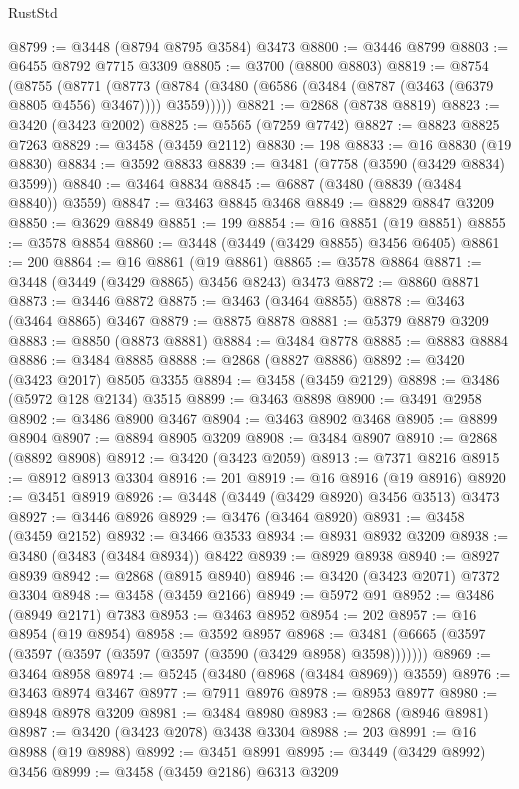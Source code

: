 \begin{lexlean}{RustStd}
\begin{coremodule}
{{{{{{{{{{{{{{{{{{{@8799 := @3448 (@8794 @8795 @3584) @3473
@8800 := @3446 @8799
@8803 := @6455 @8792 @7715 @3309
@8805 := @3700 (@8800 @8803)
@8819 := @8754
    (@8755
      (@8771
        (@8773 (@8784 (@3480 (@6586 (@3484 (@8787 (@3463 (@6379 @8805 @4556) @3467)))) @3559)))))
@8821 := @2868 (@8738 @8819)
@8823 := @3420 (@3423 @2002)
@8825 := @5565 (@7259 @7742)
@8827 := @8823 @8825 @7263
@8829 := @3458 (@3459 @2112)
@8830 := 198
@8833 := @16 @8830 (@19 @8830)
@8834 := @3592 @8833
@8839 := @3481 (@7758 (@3590 (@3429 @8834) @3599))
@8840 := @3464 @8834
@8845 := @6887 (@3480 (@8839 (@3484 @8840)) @3559)
@8847 := @3463 @8845 @3468
@8849 := @8829 @8847 @3209
@8850 := @3629 @8849
@8851 := 199
@8854 := @16 @8851 (@19 @8851)
@8855 := @3578 @8854
@8860 := @3448 (@3449 (@3429 @8855) @3456 @6405)
@8861 := 200
@8864 := @16 @8861 (@19 @8861)
@8865 := @3578 @8864
@8871 := @3448 (@3449 (@3429 @8865) @3456 @8243) @3473
@8872 := @8860 @8871
@8873 := @3446 @8872
@8875 := @3463 (@3464 @8855)
@8878 := @3463 (@3464 @8865) @3467
@8879 := @8875 @8878
@8881 := @5379 @8879 @3209
@8883 := @8850 (@8873 @8881)
@8884 := @3484 @8778
@8885 := @8883 @8884
@8886 := @3484 @8885
@8888 := @2868 (@8827 @8886)
@8892 := @3420 (@3423 @2017) @8505 @3355
@8894 := @3458 (@3459 @2129)
@8898 := @3486 (@5972 @128 @2134) @3515
@8899 := @3463 @8898
@8900 := @3491 @2958
@8902 := @3486 @8900 @3467
@8904 := @3463 @8902 @3468
@8905 := @8899 @8904
@8907 := @8894 @8905 @3209
@8908 := @3484 @8907
@8910 := @2868 (@8892 @8908)
@8912 := @3420 (@3423 @2059)
@8913 := @7371 @8216
@8915 := @8912 @8913 @3304
@8916 := 201
@8919 := @16 @8916 (@19 @8916)
@8920 := @3451 @8919
@8926 := @3448 (@3449 (@3429 @8920) @3456 @3513) @3473
@8927 := @3446 @8926
@8929 := @3476 (@3464 @8920)
@8931 := @3458 (@3459 @2152)
@8932 := @3466 @3533
@8934 := @8931 @8932 @3209
@8938 := @3480 (@3483 (@3484 @8934)) @8422
@8939 := @8929 @8938
@8940 := @8927 @8939
@8942 := @2868 (@8915 @8940)
@8946 := @3420 (@3423 @2071) @7372 @3304
@8948 := @3458 (@3459 @2166)
@8949 := @5972 @91
@8952 := @3486 (@8949 @2171) @7383
@8953 := @3463 @8952
@8954 := 202
@8957 := @16 @8954 (@19 @8954)
@8958 := @3592 @8957
@8968 := @3481 (@6665 (@3597 (@3597 (@3597 (@3597 (@3597 (@3590 (@3429 @8958) @3598)))))))
@8969 := @3464 @8958
@8974 := @5245 (@3480 (@8968 (@3484 @8969)) @3559)
@8976 := @3463 @8974 @3467
@8977 := @7911 @8976
@8978 := @8953 @8977
@8980 := @8948 @8978 @3209
@8981 := @3484 @8980
@8983 := @2868 (@8946 @8981)
@8987 := @3420 (@3423 @2078) @3438 @3304
@8988 := 203
@8991 := @16 @8988 (@19 @8988)
@8992 := @3451 @8991
@8995 := @3449 (@3429 @8992) @3456
@8999 := @3458 (@3459 @2186) @6313 @3209
}}}}}}}}}}}}}}}}}}}
\end{coremodule}
\end{lexlean}
